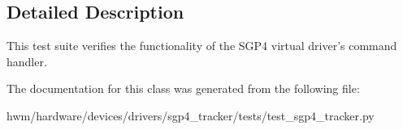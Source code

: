 \subsection{Detailed Description}
This test suite verifies the functionality of the S\-G\-P4 virtual driver's command handler. 

The documentation for this class was generated from the following file\-:\begin{DoxyCompactItemize}
\item 
hwm/hardware/devices/drivers/sgp4\-\_\-tracker/tests/test\-\_\-sgp4\-\_\-tracker.\-py\end{DoxyCompactItemize}
